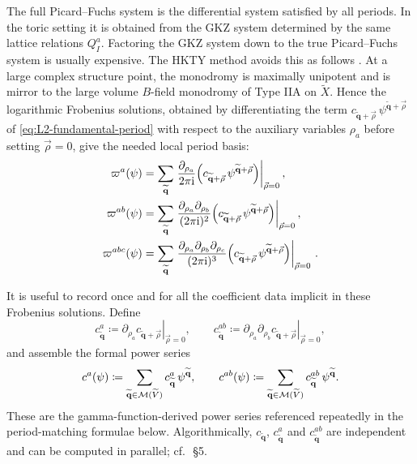 The full Picard--Fuchs system is the differential system satisfied
by all periods.  In the toric setting it is obtained from the
GKZ system determined by the same lattice relations $Q^a_I$.
Factoring the GKZ system down to the true Picard--Fuchs system is
usually expensive.  The HKTY method avoids this as follows
\cite{Hosono:1993qy}.  At a large complex structure point, the
monodromy is maximally unipotent and is mirror to the large volume
$B$-field monodromy of Type IIA on $\widetilde X$.  Hence the
logarithmic Frobenius solutions, obtained by differentiating the
term $c_{\widetilde{\mathbf q}+\vec\rho}\,
\psi^{\widetilde{\mathbf q}+\vec\rho}$ of
\eqref{eq:L2-fundamental-period} with respect to the auxiliary
variables $\rho_a$ before setting $\vec\rho=0$, give the needed local
period basis:
\begin{align}
    \varpi^a(\psi)
      &=
      \sum_{\widetilde{\mathbf q}}
      \left.
      \frac{\partial_{\rho_a}}{2\pi\mathrm{i}}
      \Bigl(c_{\widetilde{\mathbf q}+\vec\rho}\,
            \psi^{\widetilde{\mathbf q}+\vec\rho}\Bigr)
      \right|_{\vec\rho=0},\\
    \varpi^{ab}(\psi)
      &=
      \sum_{\widetilde{\mathbf q}}
      \left.
      \frac{\partial_{\rho_a}\partial_{\rho_b}}
           {(2\pi\mathrm{i})^2}
      \Bigl(c_{\widetilde{\mathbf q}+\vec\rho}\,
            \psi^{\widetilde{\mathbf q}+\vec\rho}\Bigr)
      \right|_{\vec\rho=0},\\
    \varpi^{abc}(\psi)
      &=
      \sum_{\widetilde{\mathbf q}}
      \left.
      \frac{\partial_{\rho_a}\partial_{\rho_b}\partial_{\rho_c}}
           {(2\pi\mathrm{i})^3}
      \Bigl(c_{\widetilde{\mathbf q}+\vec\rho}\,
            \psi^{\widetilde{\mathbf q}+\vec\rho}\Bigr)
      \right|_{\vec\rho=0}\, .
\end{align}

\medskip
\noindent It is useful to record once and for all the coefficient
data implicit in these Frobenius solutions.  Define
\begin{equation}\label{eq:L2-c-coefs}
    c^a_{\widetilde{\mathbf q}}
      \coloneqq 
      \left.\partial_{\rho_a}
            c_{\widetilde{\mathbf q}+\vec\rho}\right|_{\vec\rho=0},
    \qquad
    c^{ab}_{\widetilde{\mathbf q}}
      \coloneqq 
      \left.\partial_{\rho_a}\partial_{\rho_b}
            c_{\widetilde{\mathbf q}+\vec\rho}\right|_{\vec\rho=0},
\end{equation}
and assemble the formal power series
\begin{equation}\label{eq:L2-c-series}
    c^a(\psi)
      \coloneqq 
      \sum_{\widetilde{\mathbf q}\in\mathcal{M}(\widetilde V)}
      c^a_{\widetilde{\mathbf q}}\,\psi^{\widetilde{\mathbf q}},
    \qquad
    c^{ab}(\psi)
      \coloneqq 
      \sum_{\widetilde{\mathbf q}\in\mathcal{M}(\widetilde V)}
      c^{ab}_{\widetilde{\mathbf q}}\,\psi^{\widetilde{\mathbf q}}.
\end{equation}
These are the gamma-function-derived power series referenced
repeatedly in the period-matching formulae below.  Algorithmically,
$c_{\widetilde{\mathbf q}}$, $c^a_{\widetilde{\mathbf q}}$ and
$c^{ab}_{\widetilde{\mathbf q}}$ are independent and can be computed
in parallel; cf.\ \cite{Demirtas:2023als}\,\S5.


